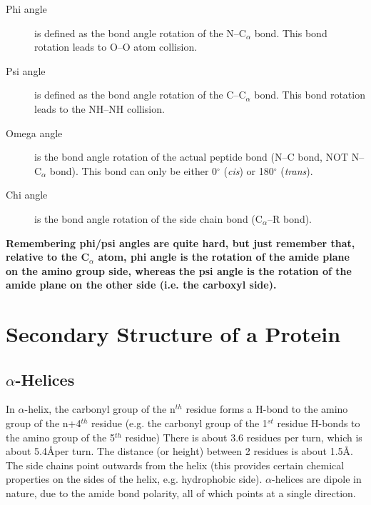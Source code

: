 \documentclass[a4paper, 12pt]{report}
\begin{document}
\begin{description}
\item [Phi angle] is defined as the bond angle rotation of the N--C$_{\alpha}$ bond.
This bond rotation leads to O--O atom collision.

\item [Psi angle] is defined as the bond angle rotation of the C--C$_{\alpha}$ bond.
This bond rotation leads to the NH--NH collision.

\item [Omega angle] is the bond angle rotation of the actual peptide bond (N--C bond, NOT N--C$_{\alpha}$ bond).
This bond can only be either 0$^{\circ}$ (\textit{cis}) or 180$^{\circ}$ (\textit{trans}).

\item [Chi angle] is the bond angle rotation of the side chain bond (C$_{\alpha}$--R bond).

\end{description}

\vspace{0.3cm}

\noindent
\textbf{Remembering phi/psi angles are quite hard, but just remember that, relative to the C$_{\alpha}$ atom, phi angle is the rotation of the amide plane on the amino group side, whereas the psi angle is the rotation of the amide plane on the other side (i.e. the carboxyl side).}

\section{Secondary Structure of a Protein}

\subsection{$\alpha$-Helices}

In $\alpha$-helix, the carbonyl group of the n$^{th}$ residue forms a H-bond to the amino group of the n+4$^{th}$ residue (e.g. the carbonyl group of the 1$^{st}$ residue H-bonds to the amino group of the 5$^{th}$ residue)
There is about 3.6 residues per turn, which is about 5.4\AA per turn.
The distance (or height) between 2 residues is about 1.5\AA.
The side chains point outwards from the helix (this provides certain chemical properties on the sides of the helix, e.g. hydrophobic side). 
$\alpha$-helices are dipole in nature, due to the amide bond polarity, all of which points at a single direction.
\end{document}
